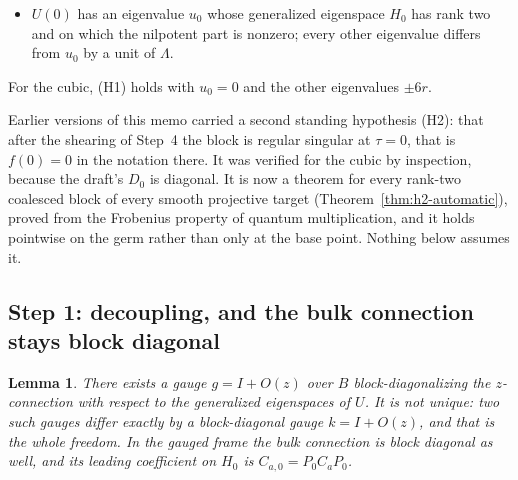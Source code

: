 \documentclass[11pt]{article}
\newtheorem{lemma}[theorem]{Lemma}
\theoremstyle{definition}
\theoremstyle{remark}
\begin{document}
\begin{itemize}
\item[(H1)] $U(0)$ has an eigenvalue $u_0$ whose generalized eigenspace $H_0$
  has rank two and on which the nilpotent part is nonzero; every other
  eigenvalue differs from $u_0$ by a unit of $\Lambda$.
\end{itemize}

For the cubic, (H1) holds with $u_0=0$ and the other eigenvalues $\pm6r$.

Earlier versions of this memo carried a second standing hypothesis (H2): that
after the shearing of Step~4 the block is regular singular at $\tau=0$, that is
$f(0)=0$ in the notation there. It was verified for the cubic by inspection,
because the draft's $D_0$ is diagonal. It is now a theorem for every rank-two
coalesced block of every smooth projective target
(Theorem~\ref{thm:h2-automatic}), proved from the Frobenius property of quantum
multiplication, and it holds pointwise on the germ rather than only at the base
point. Nothing below assumes it.

\subsection*{Step 1: decoupling, and the bulk connection stays block diagonal}

\begin{lemma}
\label{lem:decouple}
There exists a gauge $g=I+O(z)$ over $B$ block-diagonalizing the $z$-connection
with respect to the generalized eigenspaces of $U$. It is \emph{not} unique: two
such gauges differ exactly by a block-diagonal gauge $k=I+O(z)$, and that is the
whole freedom. In the gauged frame the bulk connection is block diagonal as well,
and its leading coefficient on $H_0$ is $C_{a,0}=P_0C_aP_0$.
\end{lemma}
\end{document}
